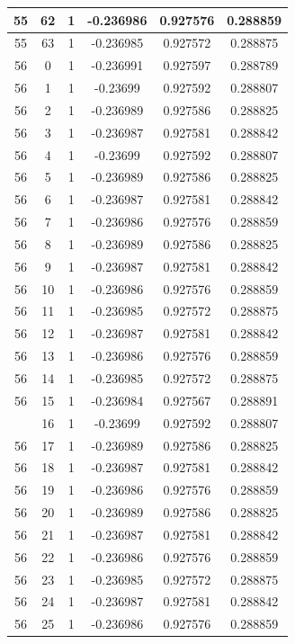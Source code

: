 \documentclass[12pt,a4paper]{article}
\numberwithin{equation}{section}
\numberwithin{figure}{section}
\numberwithin{table}{section}
\begin{document}
\begin{longtable}{|c|c|c|c|c|c|}
55 & 62 & 1 & -0.236986 & 0.927576 & 0.288859 \\ \hline
55 & 63 & 1 & -0.236985 & 0.927572 & 0.288875 \\ \hline
56 & 0 & 1 & -0.236991 & 0.927597 & 0.288789 \\ \hline
56 & 1 & 1 & -0.23699 & 0.927592 & 0.288807 \\ \hline
56 & 2 & 1 & -0.236989 & 0.927586 & 0.288825 \\ \hline
56 & 3 & 1 & -0.236987 & 0.927581 & 0.288842 \\ \hline
56 & 4 & 1 & -0.23699 & 0.927592 & 0.288807 \\ \hline
56 & 5 & 1 & -0.236989 & 0.927586 & 0.288825 \\ \hline
56 & 6 & 1 & -0.236987 & 0.927581 & 0.288842 \\ \hline
56 & 7 & 1 & -0.236986 & 0.927576 & 0.288859 \\ \hline
56 & 8 & 1 & -0.236989 & 0.927586 & 0.288825 \\ \hline
56 & 9 & 1 & -0.236987 & 0.927581 & 0.288842 \\ \hline
56 & 10 & 1 & -0.236986 & 0.927576 & 0.288859 \\ \hline
56 & 11 & 1 & -0.236985 & 0.927572 & 0.288875 \\ \hline
56 & 12 & 1 & -0.236987 & 0.927581 & 0.288842 \\ \hline
56 & 13 & 1 & -0.236986 & 0.927576 & 0.288859 \\ \hline
56 & 14 & 1 & -0.236985 & 0.927572 & 0.288875 \\ \hline
56 & 15 & 1 & -0.236984 & 0.927567 & 0.288891 \\ \hline
\pagebreak
56 & 16 & 1 & -0.23699 & 0.927592 & 0.288807 \\ \hline
56 & 17 & 1 & -0.236989 & 0.927586 & 0.288825 \\ \hline
56 & 18 & 1 & -0.236987 & 0.927581 & 0.288842 \\ \hline
56 & 19 & 1 & -0.236986 & 0.927576 & 0.288859 \\ \hline
56 & 20 & 1 & -0.236989 & 0.927586 & 0.288825 \\ \hline
56 & 21 & 1 & -0.236987 & 0.927581 & 0.288842 \\ \hline
56 & 22 & 1 & -0.236986 & 0.927576 & 0.288859 \\ \hline
56 & 23 & 1 & -0.236985 & 0.927572 & 0.288875 \\ \hline
56 & 24 & 1 & -0.236987 & 0.927581 & 0.288842 \\ \hline
56 & 25 & 1 & -0.236986 & 0.927576 & 0.288859 \\ \hline

\end{longtable}
\end{document}
